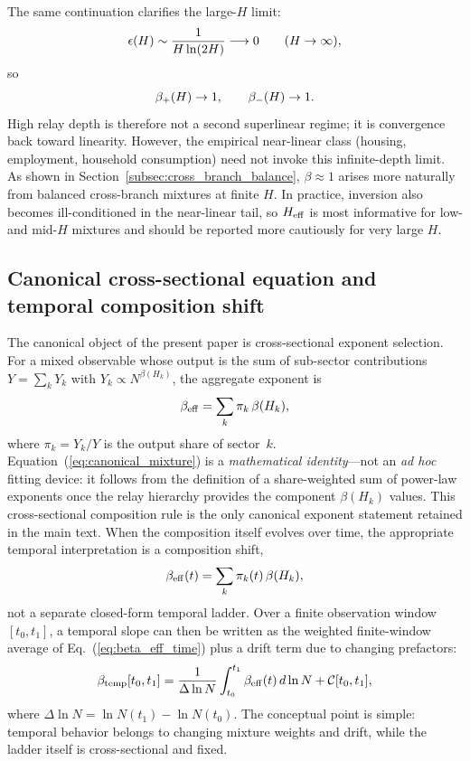 The same continuation clarifies the large-\(H\) limit:
\begin{equation}
\epsilon\!\left(H\right)\sim \frac{1}{H\ln(2H)}\longrightarrow 0\qquad (H\to\infty),
\label{eq:largeH}
\end{equation}
so
\begin{equation}
\beta_+\!\left(H\right)\to 1,\qquad\beta_-\!\left(H\right)\to 1.
\label{eq:linear_limit}
\end{equation}
High relay depth is therefore not a second superlinear regime; it is
convergence back toward linearity.
However, the empirical near-linear class (housing, employment, household
consumption) need not invoke this infinite-depth limit.
As shown in Section~\ref{subsec:cross_branch_balance}, $\beta\approx 1$
arises more naturally from balanced cross-branch mixtures at finite $H$.
In practice, inversion also becomes ill-conditioned in the near-linear tail,
so \(H_{\mathrm{eff}}\) is most informative for low- and mid-\(H\) mixtures and should
be reported more cautiously for very large \(H\).

\subsection{Canonical cross-sectional equation and temporal composition shift}

The canonical object of the present paper is cross-sectional exponent
selection.
For a mixed observable whose output is the sum of sub-sector contributions
$Y=\sum_k Y_k$ with $Y_k\propto N^{\beta(H_k)}$, the aggregate exponent
is
\begin{equation}
\beta_{\mathrm{eff}}=\sum_k \pi_k\,\beta(H_k),
\label{eq:canonical_mixture}
\end{equation}
where $\pi_k=Y_k/Y$ is the output share of sector~$k$.
Equation~(\ref{eq:canonical_mixture}) is a \emph{mathematical identity}---not
an \emph{ad hoc} fitting device: it follows from the definition of a
share-weighted sum of power-law exponents once the relay hierarchy provides
the component $\beta(H_k)$ values.
This cross-sectional composition rule is the only canonical exponent
statement retained in the main text.
When the composition itself evolves over time, the appropriate temporal
interpretation is a composition shift,
\begin{equation}
\beta_{\mathrm{eff}}(t)=\sum_k \pi_k(t)\,\beta(H_k),
\label{eq:beta_eff_time}
\end{equation}
not a separate closed-form temporal ladder.
Over a finite observation window \([t_0,t_1]\), a temporal slope can then be
written as the weighted finite-window average of Eq.~(\ref{eq:beta_eff_time})
plus a drift term due to changing prefactors:
\begin{equation}
\beta_{\mathrm{temp}}[t_0,t_1]=
\frac{1}{\Delta\ln N}\int_{t_0}^{t_1}\beta_{\mathrm{eff}}(t)\,d\ln N
+\mathcal{C}[t_0,t_1],
\label{eq:temporal_fd}
\end{equation}
where \(\Delta\ln N=\ln N(t_1)-\ln N(t_0)\).
The conceptual point is simple: temporal behavior belongs to changing mixture
weights and drift, while the ladder itself is cross-sectional and fixed.

